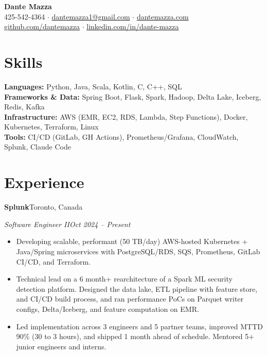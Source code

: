 \documentclass[letterpaper,10pt]{article}
\newcommand{\company}[2]{%
  \noindent\textbf{#1}\hfill #2\par%
}
\newcommand{\subrole}[2]{%
  \noindent\textit{#1}\hfill \textit{#2}\par%
}
\newenvironment{bullets}{%
  \begin{itemize}[leftmargin=1.5em,topsep=2pt,itemsep=1pt,parsep=0pt]%
}{\end{itemize}}
\begin{document}
\begin{center}
  {\fontsize{32}{34}\selectfont \textbf{Dante Mazza}}\\[3pt]
  {\small 425-542-4364 $\cdot$ \href{mailto:dantemazza1@gmail.com}{dantemazza1@gmail.com} $\cdot$ \href{https://dantemazza.com}{dantemazza.com}\\[1pt]
  \href{https://github.com/dantemazza}{github.com/dantemazza} $\cdot$ \href{https://www.linkedin.com/in/dante-mazza}{linkedin.com/in/dante-mazza}}
\end{center}

\section{Skills}
\textbf{Languages:} Python, Java, Scala, Kotlin, C, C++, SQL\\
\textbf{Frameworks \& Data:} Spring Boot, Flask, Spark, Hadoop, Delta Lake, Iceberg, Redis, Kafka\\
\textbf{Infrastructure:} AWS (EMR, EC2, RDS, Lambda, Step Functions), Docker, Kubernetes, Terraform, Linux\\
\textbf{Tools:} CI/CD (GitLab, GH Actions), Prometheus/Grafana, CloudWatch, Splunk, Claude Code

\section{Experience}

\company{Splunk}{Toronto, Canada}
\subrole{Software Engineer II}{Oct 2024 -- Present}
\begin{bullets}
  \item Developing scalable, performant (50 TB/day) AWS-hosted Kubernetes + Java/Spring microservices with PostgreSQL/RDS, SQS, Prometheus, GitLab CI/CD, and Terraform.
  \item Technical lead on a 6 month+ rearchitecture of a Spark ML security detection platform. Designed the data lake, ETL pipeline with feature store, and CI/CD build process, and ran performance PoCs on Parquet writer configs, Delta/Iceberg, and feature computation on EMR.
  \item Led implementation across 3 engineers and 5 partner teams, improved MTTD 90\% (30 to 3 hours), and shipped 1 month ahead of schedule. Mentored 5+ junior engineers and interns.
\end{bullets}
\end{document}
